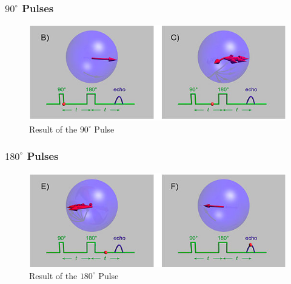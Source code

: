 \begin{frame}
  \frametitle{$90^{\circ}$ Pulses}
        \begin{center}
                \begin{figure}
                \begin{center}
                        \includegraphics[width=\linewidth]{./images/Figures/theory/90deg.png}
                \end{center}
                \caption{Result of the $90^{\circ}$ Pulse \cite{spin_echo}}
                \label{fig:90_deg}
                \end{figure}
        \end{center}
\end{frame}

\begin{frame}
  \frametitle{$180^{\circ}$ Pulses}
        \begin{center}
                \begin{figure}
                \begin{center}
                        \includegraphics[width=\linewidth]{./images/Figures/theory/180deg.png}
                \end{center}
                \caption{Result of the $180^{\circ}$ Pulse \cite{spin_echo}}
                \label{fig:180_deg}
                \end{figure}
        \end{center}
\end{frame}
